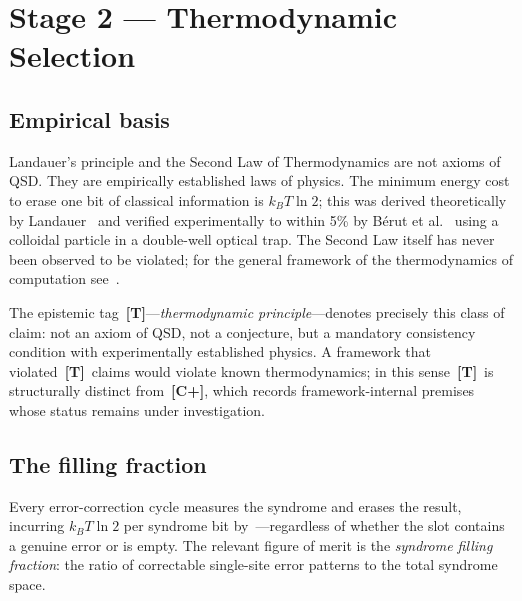 \documentclass[11pt,a4paper]{article}
\newcommand{\Cpmark}{\textcolor{blue!70!black}{\textbf{[C+]}}}
\newcommand{\Tmark}{\textcolor{orange!70!black}{\textbf{[T]}}}
\begin{document}
\newpage

\section{Stage 2 --- Thermodynamic Selection}
\label{sec:thermo}

\subsection{Empirical basis}
\label{sec:thermo_empirical}

Landauer's principle and the Second Law of Thermodynamics are not axioms of QSD. They are empirically established laws of physics. The minimum energy cost to erase one bit of classical information is $k_B T \ln 2$; this was derived theoretically by Landauer~\cite{Landauer1961} and verified experimentally to within 5\% by B\'erut et al.~\cite{Berut2012} using a colloidal particle in a double-well optical trap. The Second Law itself has never been observed to be violated; for the general framework of the thermodynamics of computation see~\cite{Bennett1982}.

The epistemic tag~\Tmark---\emph{thermodynamic principle}---denotes precisely this class of claim: not an axiom of QSD, not a conjecture, but a mandatory consistency condition with experimentally established physics. A framework that violated~\Tmark\ claims would violate known thermodynamics; in this sense~\Tmark\ is structurally distinct from~\Cpmark, which records framework-internal premises whose status remains under investigation.

\subsection{The filling fraction}
\label{sec:filling_fraction}

Every error-correction cycle measures the syndrome and erases the result, incurring $k_B T \ln 2$ per syndrome bit by~\cite{Landauer1961, Berut2012}---regardless of whether the slot contains a genuine error or is empty. The relevant figure of merit is the \emph{syndrome filling fraction}: the ratio of correctable single-site error patterns to the total syndrome space.
\end{document}
